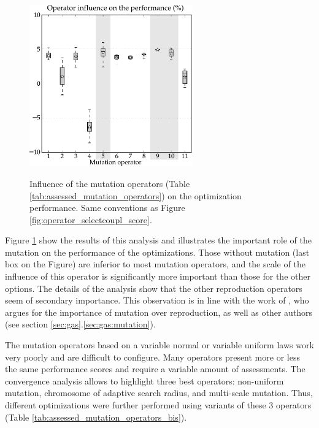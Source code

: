 \documentclass[twocol]{ametsoc}
\begin{document}
\begin{figure}[htb]
	\begin{center}
		\noindent\includegraphics[width=7cm,angle=0]{figures/operator_mutation_score.pdf}\\
	\end{center}
	\caption{Influence of the mutation operators (Table \ref{tab:assessed_mutation_operators}) on the optimization performance. Same conventions as Figure \ref{fig:operator_selectcoupl_score}.}
	\label{fig:operator_mutation_score}
\end{figure}


Figure \ref{fig:operator_mutation_score} show the results of this analysis and illustrates the important role of the mutation on the performance of the optimizations. Those without mutation (last box on the Figure) are inferior to most mutation operators, and the scale of the influence of this operator is significantly more important than those for the other options. The details of the analysis \citep[see][]{Horton2012a} show that the other reproduction operators seem of secondary importance. This observation is in line with the work of \citet{Back1996a}, who argues for the importance of mutation over reproduction, as well as other authors (see section \ref{sec:gas}.\ref{sec:gas:mutation}).

The mutation operators based on a variable normal or variable uniform laws work very poorly and are difficult to configure. Many operators present more or less the same performance scores and require a variable amount of assessments. The convergence analysis \citep[see][]{Horton2012a} allows to highlight three best operators: non-uniform mutation, chromosome of adaptive search radius, and multi-scale mutation. Thus, different optimizations were further performed using variants of these 3 operators (Table \ref{tab:assessed_mutation_operators_bis}).
\end{document}
